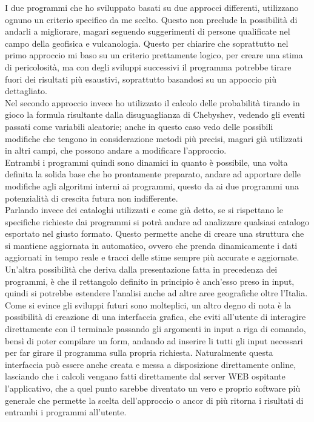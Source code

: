 I due programmi che ho sviluppato basati su due approcci differenti, utilizzano ognuno un criterio specifico da me scelto. Questo non preclude la possibilit\`a di andarli a migliorare, magari seguendo suggerimenti di persone qualificate nel campo della geofisica e vulcanologia. Questo per chiarire che soprattutto nel primo approccio mi baso su un criterio prettamente logico, per creare una stima di pericolosit\`a, ma con degli sviluppi successivi il programma potrebbe tirare fuori dei risultati pi\`u esaustivi, soprattutto basandosi su un appoccio pi\`u dettagliato.\\
Nel secondo approccio invece ho utilizzato il calcolo delle probabilit\`a tirando in gioco la formula risultante dalla disuguaglianza di Chebyshev, vedendo gli eventi passati come variabili aleatorie; anche in questo caso vedo delle possibili modifiche che tengono in considerazione metodi pi\`u precisi, magari gi\`a utilizzati in altri campi, che possono andare a modificare l'approccio.\\
Entrambi i programmi quindi sono dinamici in quanto \`e possibile, una volta definita la solida base che ho prontamente preparato, andare ad apportare delle modifiche agli algoritmi interni ai programmi, questo da ai due programmi una potenzialit\`a di crescita futura non indifferente.\\
Parlando invece dei cataloghi utilizzati e come gi\`a detto, se si rispettano le specifiche richieste dai programmi si potr\`a andare ad analizzare qualsiasi catalogo esportato nel giusto formato. Questo permette anche di creare una struttura che si mantiene aggiornata in automatico, ovvero che prenda dinamicamente i dati aggiornati in tempo reale e tracci delle stime sempre pi\`u accurate e aggiornate.\\
Un'altra possibilit\`a che deriva dalla presentazione fatta in precedenza dei programmi, \`e che il rettangolo definito in principio \`e anch'esso preso in input, quindi si potrebbe estendere l'analisi anche ad altre aree geografiche oltre l'Italia.\\
Come si evince gli sviluppi futuri sono molteplici, un altro degno di nota \`e la possibilit\`a di creazione di una interfaccia grafica, che eviti all'utente di interagire direttamente con il terminale passando gli argomenti in input a riga di comando, bens\`i di poter compilare un form, andando ad inserire li tutti gli input necessari per far girare il programma sulla propria richiesta. Naturalmente questa interfaccia pu\`o essere anche creata e messa a disposizione direttamente online, lasciando che i calcoli vengano fatti direttamente dal server WEB ospitante l'applicativo, che a quel punto sarebbe diventato un vero e proprio software pi\`u generale che permette la scelta dell'approccio o ancor di pi\`u ritorna i risultati di entrambi i programmi all'utente.